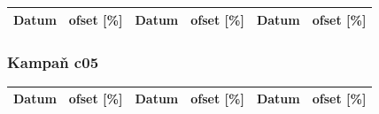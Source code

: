 \documentclass[a4paper,twoside,11pt]{article}
\begin{document}
\begin{tabular}{|l|l||l|l||l|l|}
\hline
Datum & ofset [\%] & Datum & ofset [\%] & Datum & ofset [\%]\\
\hline

\end{tabular}



\subsubsection{Kampaň c05}

\begin{tabular}{|l|l||l|l||l|l|}
\hline
Datum & ofset [\%] & Datum & ofset [\%] & Datum & ofset [\%]\\
\hline

\end{tabular}
\end{document}

